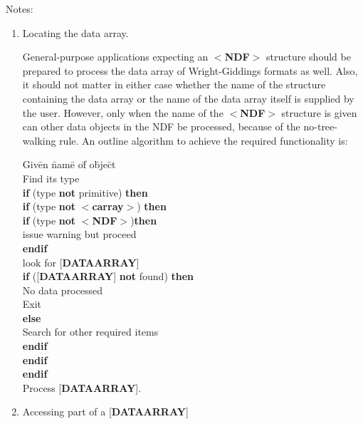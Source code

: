 \documentclass[twoside,11pt]{article}
\renewcommand{\_}{\texttt{\symbol{95}}}
\begin{document}
\goodbreak
Notes:
\begin{enumerate}
\item Locating the data array.

General-purpose applications expecting an $<${\bf NDF}$>$ structure should 
be prepared to process
the data array of Wright-Giddings formats as well.  Also, it should not 
matter in either case whether the name of the structure containing the
data array or the name of the data array itself is supplied by the user.
However, only when the name of the $<${\bf NDF}$>$ structure is given can
other data objects in the NDF be processed, because of the no-tree-walking
rule. An outline algorithm to achieve the required functionality is:

\begin{tabbing}
Giv\=en \=nam\=e o\=f o\=bje\=ct\\
Find its type\\
{\bf if} (type {\bf not} primitive) {\bf then}\+ \\
   {\bf if} (type {\bf not} $<${\bf c\_array}$>$) {\bf then}\+ \\
      {\bf if} (type {\bf not} $<${\bf NDF}$>$){\bf then}\+ \\
         issue warning but proceed\- \\
      {\bf endif} \\
      look for {[}{\bf DATA\_ARRAY}{]} \\
      {\bf if} ({[}{\bf DATA\_ARRAY}{]} {\bf not} found) {\bf then}\+ \\
         No data processed \\
         Exit\- \\
      {\bf else}\+ \\
         Search for other required items\- \\
      {\bf endif}\- \\
   {\bf endif}\- \\
{\bf endif} \\
Process {[}{\bf DATA\_ARRAY}{]}.
\end{tabbing}

\item Accessing part of a {[}{\bf DATA\_ARRAY}{]}


\end{enumerate}
\end{document}
